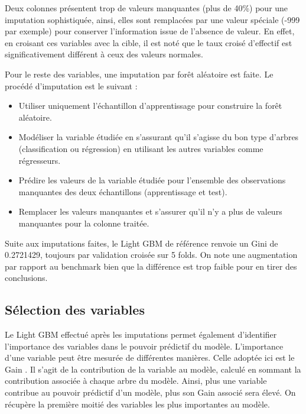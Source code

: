 \documentclass[french]{article}
\begin{document}
\begin{multicols}{2}
Deux colonnes présentent trop de valeurs manquantes (plus de 40\%) pour une imputation sophistiquée, ainsi, elles sont remplacées par une valeur spéciale (-999 par exemple) pour conserver l'information issue de l'absence de valeur. En effet, en croisant ces variables avec la cible, il est noté que le taux croisé d'effectif est significativement différent à ceux des valeurs normales.

Pour le reste des variables, une imputation par forêt aléatoire est faite. Le procédé d'imputation est le suivant :
\begin{itemize}
    \item Utiliser uniquement l'échantillon d'apprentissage pour construire la forêt aléatoire.
    \item Modéliser la variable étudiée en s'assurant qu'il s'agisse du bon type d'arbres (classification ou régression) en utilisant les autres variables comme régresseurs.
    \item Prédire les valeurs de la variable étudiée pour l'ensemble des observations manquantes des deux échantillons (apprentissage et test).
    \item Remplacer les valeurs manquantes et s'assurer qu'il n'y a plus de valeurs manquantes pour la colonne traitée.
\end{itemize}

Suite aux imputations faites, le Light GBM de référence renvoie un Gini de 0.2721429, toujours par validation croisée sur 5 folds. On note une augmentation par rapport au benchmark bien que la différence est trop faible pour en tirer des conclusions.

\subsection{Sélection des variables}

Le Light GBM effectué après les imputations permet également d'identifier l'importance des variables dans le pouvoir prédictif du modèle. L'importance d'une variable peut être mesurée de différentes manières. Celle adoptée ici est le \og Gain \fg{}. Il s'agit de la contribution de la variable au modèle, calculé en sommant la contribution associée à chaque arbre du modèle. Ainsi, plus une variable contribue au pouvoir prédictif d'un modèle, plus son \og Gain \fg{} associé sera élevé. On récupère la première moitié des variables les plus importantes au modèle.


\end{multicols}
\end{document}
